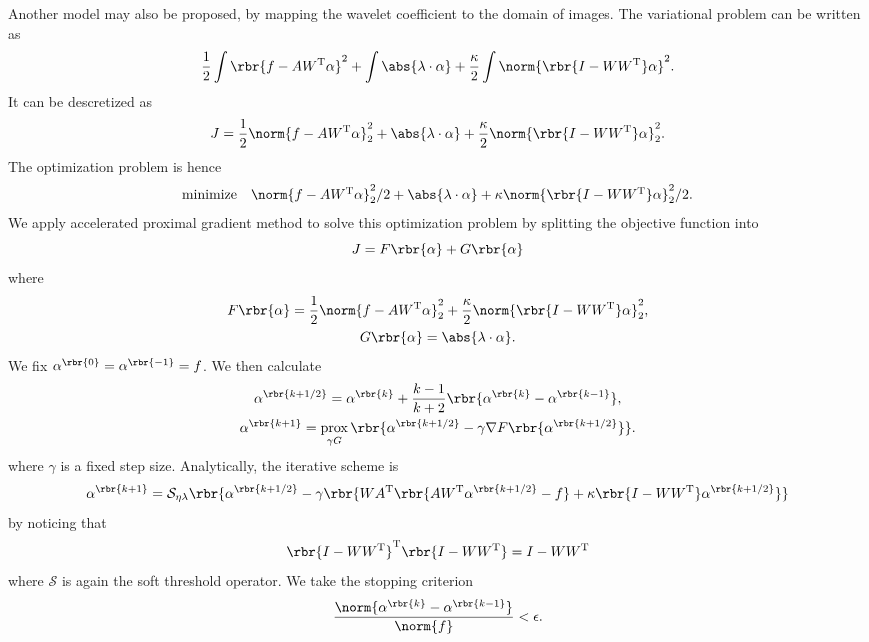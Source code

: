 \documentclass[english, nochinese]{pnote}
\DeclareMathOperator\opprox{\mathrm{prox}}
\begin{document}
Another model may also be proposed, by mapping the wavelet coefficient to the domain of images. The variational problem can be written as
\begin{equation}
\frac{1}{2} \int \rbr{ f - A W^{\text{T}} \alpha }^2 + \int \abs{ \lambda \cdot \alpha } + \frac{\kappa}{2} \int \norm{ \rbr{ I - W W^{\text{T}} } \alpha }^2.
\end{equation}
It can be descretized as
\begin{equation}
J = \frac{1}{2} \norm{ f - A W^{\text{T}} \alpha }_2^2 + \abs{ \lambda \cdot \alpha } + \frac{\kappa}{2} \norm{ \rbr{ I - W W^{\text{T}} } \alpha }_2^2.
\end{equation}
The optimization problem is hence
\begin{equation}
\begin{array}{ll}
\text{minimize} & \norm{ f - A W^{\text{T}} \alpha }_2^2 / 2 + \abs{ \lambda \cdot \alpha } + \kappa \norm{ \rbr{ I - W W^{\text{T}} } \alpha }_2^2 / 2 .
\end{array}
\end{equation}
We apply accelerated proximal gradient method to solve this optimization problem by splitting the objective function into
\begin{equation}
J = F \rbr{\alpha} + G \rbr{\alpha}
\end{equation}
where
\begin{gather}
F \rbr{\alpha} = \frac{1}{2} \norm{ f - A W^{\text{T}} \alpha }_2^2 + \frac{\kappa}{2} \norm{ \rbr{ I - W W^{\text{T}} } \alpha }_2^2, \\
G \rbr{\alpha} = \abs{ \lambda \cdot \alpha }.
\end{gather}
We fix $ \alpha^{\rbr{0}} = \alpha^{\rbr{-1}} = f $. We then calculate
\begin{gather}
\alpha^{\rbr{ k + 1 / 2 }} = \alpha^{\rbr{k}} + \frac{ k - 1 }{ k + 2 } \rbr{ \alpha^{\rbr{k}} - \alpha^{\rbr{ k - 1 }} }, \\
\alpha^{\rbr{ k + 1 }} = \opprox_{ \gamma G } \rbr{ \alpha^{\rbr{ k + 1 / 2 }} - \gamma \nabla F \rbr{\alpha^{\rbr{ k + 1 / 2 }}} }.
\end{gather}
where $\gamma$ is a fixed step size. Analytically, the iterative scheme is
\begin{equation}
\alpha^{\rbr{ k + 1 }} = \mathcal{S}_{ \eta \lambda } \rbr{ \alpha^{\rbr{ k + 1 / 2 }} - \gamma \rbr{ W A^{\text{T}} \rbr{ A W^{\text{T}} \alpha^{\rbr{ k + 1 / 2 }} - f } + \kappa \rbr{ I - W W^{\text{T}} } \alpha^{\rbr{ k + 1 / 2 }} } }
\end{equation}
by noticing that
\begin{equation}
\rbr{ I - W W^{\text{T}} }^{\text{T}} \rbr{ I - W W^{\text{T}} } = I - W W^{\text{T}}
\end{equation}
where $\mathcal{S}$ is again the soft threshold operator. We take the stopping criterion
\begin{equation}
\frac{\norm{ \alpha^{\rbr{k}} - \alpha^{\rbr{ k - 1 }} }}{\norm{f}} < \epsilon.
\end{equation}
\end{document}
